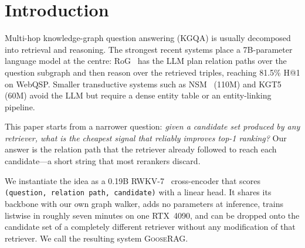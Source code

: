\documentclass[sigconf,review]{acmart}
\begin{document}

\maketitle

\section{Introduction}
\label{sec:intro}

Multi-hop knowledge-graph question answering (KGQA) is usually decomposed into retrieval and reasoning. The strongest recent systems place a 7B-parameter language model at the centre: RoG~\cite{luo2024rog} has the LLM plan relation paths over the question subgraph and then reason over the retrieved triples, reaching 81.5\% H@1 on WebQSP. Smaller transductive systems such as NSM~\cite{he2021nsm} (110M) and KGT5~\cite{saxena2022kgt5} (60M) avoid the LLM but require a dense entity table or an entity-linking pipeline.

This paper starts from a narrower question: \emph{given a candidate set produced by any retriever, what is the cheapest signal that reliably improves top-1 ranking?} Our answer is the relation path that the retriever already followed to reach each candidate---a short string that most rerankers discard.

We instantiate the idea as a 0.19B RWKV-7~\cite{peng2023rwkv,peng2025rwkv7} cross-encoder that scores \texttt{(question, relation path, candidate)} with a linear head. It shares its backbone with our own graph walker, adds no parameters at inference, trains listwise in roughly seven minutes on one RTX~4090, and can be dropped onto the candidate set of a completely different retriever without any modification of that retriever. We call the resulting system \textsc{GooseRAG}.
\end{document}
